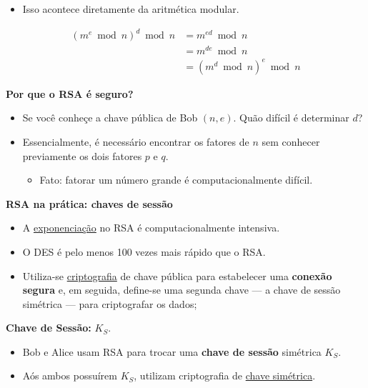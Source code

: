     \begin{itemize}[left=0.5cm, align=left, nosep]
        \item Isso acontece diretamente da aritmética modular.
    \end{itemize}
    \[
    \begin{aligned}
    (m^e \bmod n)^d \bmod n &= m^{ed} \bmod n \\
                            &= m^{de} \bmod n \\
                            &= (m^d \bmod n)^e \bmod n
    \end{aligned}
    \]

    \textbf{Por que o RSA é seguro?}

    \begin{itemize}[left=0.5cm, align=left, nosep]
        \item Se você conheçe a chave pública de Bob $(n, e)$. Quão difícil é determinar $d$?
        \item Essencialmente, é necessário encontrar os fatores de $n$ sem conhecer previamente os dois fatores $p$ e $q$.
        \begin{itemize}[left=0.5cm, nosep, label=$\hookrightarrow$]
            \item Fato: fatorar um número grande é computacionalmente difícil.
        \end{itemize}
    \end{itemize}

    \textbf{RSA na prática: chaves de sessão}
    \begin{itemize}[left=0.5cm, align=left, nosep]
        \item A \underline{exponenciação} no RSA é computacionalmente intensiva.
        \item O DES é pelo menos 100 vezes mais rápido que o RSA.
        \item Utiliza-se \underline{criptografia} de chave pública para estabelecer uma \textbf{conexão segura} e, em seguida, define-se uma segunda chave — a chave de 
        sessão simétrica — para criptografar os dados; 
    \end{itemize}

    \textbf{Chave de Sessão: } $K_S$.
    \begin{itemize}[left=0.5cm, align=left, nosep]
        \item Bob e Alice usam RSA para trocar uma \textbf{chave de sessão} simétrica $K_S$.
        \item Aós ambos possuírem $K_S$, utilizam criptografia de \underline{chave simétrica}.
    \end{itemize}

